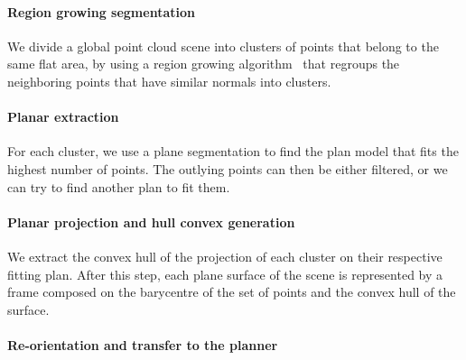\paragraph{Region growing segmentation}

We divide a global point cloud scene into clusters of points that belong to the same flat area, by using a region growing algorithm~\cite{poppinga:iros:2008} that regroups the neighboring points that have similar normals into clusters.

\paragraph{Planar extraction}

For each cluster, we use a plane segmentation to find the plan model that fits the highest number of points.
The outlying points can then be either filtered, or we can try to find another plan to fit them.

\paragraph{Planar projection and hull convex generation}

We extract the convex hull of the projection of each cluster on their respective fitting plan.
After this step, each plane surface of the scene is represented by a frame composed on the barycentre of the set of points and the convex hull of the surface.

\paragraph{Re-orientation and transfer to the planner}

